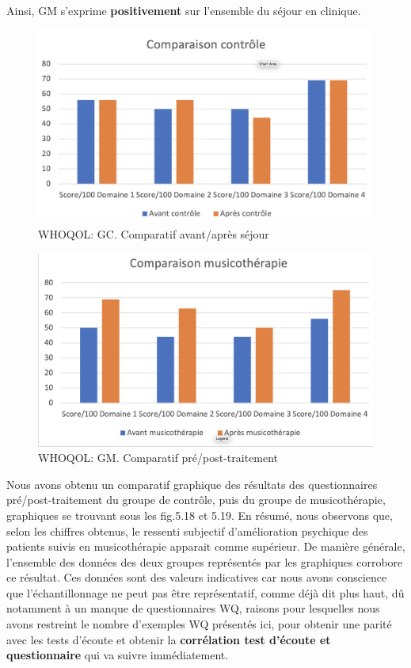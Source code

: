                  Ainsi,  GM s'exprime
                 \textbf{positivement }
                 sur l'ensemble du séjour en clinique.

    
                
\begin{figure}
\centering
\includegraphics[width=0.7\linewidth]{images/Compcontrole.png}
\caption[Schéma du déroulement]{WHOQOL:  GC. Comparatif avant/après séjour}
       
\label{groupecontroleimage1}
\end{figure}

\begin{figure}
\centering
\includegraphics[width=0.7\linewidth]{images/Compmusico.png}
\caption[Schéma du déroulement]{ WHOQOL: GM. Comparatif pré/post-traitement }
       
\label{groupecontroleimage1}
\end{figure}


Nous avons obtenu un comparatif graphique  des résultats des
                 questionnaires pré/post-traitement du groupe de contrôle,
                 puis du groupe de musicothérapie, graphiques se trouvant sous les fig.5.18 et 5.19.
       En résumé, nous observons que, selon les chiffres obtenus, le ressenti
       subjectif d'amélioration psychique 
        des patients suivis en musicothérapie apparait comme
        supérieur.
        De manière générale, l'ensemble des données des deux groupes représentés
        par les graphiques corrobore ce résultat.
        Ces données sont des valeurs indicatives car nous avons conscience que l'échantillonnage ne
        peut pas être représentatif, comme déjà dit plus haut, dû
        notamment à un
        manque de
        questionnaires WQ, raisons pour lesquelles nous avons
        restreint le nombre d'exemples WQ présentés ici, pour obtenir
        une parité avec les tests d'écoute et obtenir la
        \textbf{corrélation test d'écoute et questionnaire} qui va
        suivre immédiatement.
        
